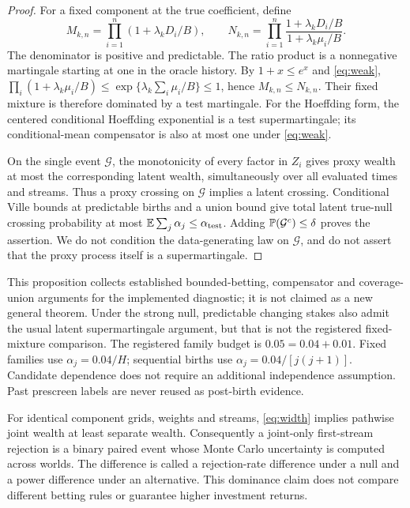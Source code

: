 \begin{proof}
For a fixed component at the true coefficient, define
\[
 M_{k,n}=\prod_{i=1}^n(1+\lambda_kD_i/B),\qquad
 N_{k,n}=\prod_{i=1}^n
 \frac{1+\lambda_kD_i/B}{1+\lambda_k\mu_i/B}.
\]
The denominator is positive and predictable. The ratio product is a nonnegative
martingale starting at one in the oracle history. By $1+x\leq e^x$ and
\eqref{eq:weak},
$\prod_i(1+\lambda_k\mu_i/B)\leq
\exp\{\lambda_k\sum_i\mu_i/B\}\leq1$, hence $M_{k,n}\leq N_{k,n}$.
Their fixed mixture is therefore dominated by a test martingale. For the
Hoeffding form, the centered conditional Hoeffding exponential is a test
supermartingale; its conditional-mean compensator is also at most one under
\eqref{eq:weak}.

On the single event $\mathcal G$, the monotonicity of every factor in $Z_i$
gives proxy wealth at most the corresponding latent wealth, simultaneously
over all evaluated times and streams. Thus a proxy crossing on $\mathcal G$
implies a latent crossing. Conditional Ville bounds at predictable births and
a union bound give total latent true-null crossing probability at most
$\mathbb{E}\sum_j\alpha_j\leq\alpha_{\rm test}$. Adding
$\mathbb{P}(\mathcal G^c)\leq\delta$ proves the assertion. We do not condition the
data-generating law on $\mathcal G$, and do not assert that the proxy process
itself is a supermartingale.
\end{proof}

This proposition collects established bounded-betting, compensator and
coverage-union arguments for the implemented diagnostic; it is not claimed as
a new general theorem. Under the strong null, predictable changing stakes also
admit the usual latent supermartingale argument, but that is not the registered
fixed-mixture comparison. The registered family budget is $0.05=0.04+0.01$.
Fixed families use $\alpha_j=0.04/H$; sequential births use
$\alpha_j=0.04/[j(j+1)]$. Candidate dependence does not require an additional
independence assumption. Past prescreen labels are never reused as post-birth
evidence.

For identical component grids, weights and streams, \eqref{eq:width} implies
pathwise joint wealth at least separate wealth. Consequently a joint-only
first-stream rejection is a binary paired event whose Monte Carlo uncertainty
is computed across worlds. The difference is called a rejection-rate difference
under a null and a power difference under an alternative. This dominance claim
does not compare different betting rules or guarantee higher investment returns.

